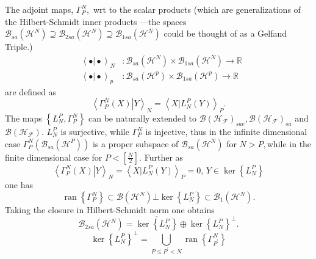 \documentclass[aps,preprint]{revtex4}%
\begin{document}
The adjoint maps, $\Gamma_{P}^{N},$ wrt to the scalar products (which are
generalizations of the Hilbert-Schmidt inner products ---the spaces
$\mathcal{B}_{sa}\left(  \mathcal{H}^{N}\right)  \supseteq\mathcal{B}%
_{2sa}\left(  \mathcal{H}^{N}\right)  \supseteq\mathcal{B}_{1sa}\left(
\mathcal{H}^{N}\right)  $ could be thought of as a Gelfand Triple.)
\begin{align}
\text{ }\left\langle \left.  \bullet\right\vert \bullet\right\rangle _{N}  &
:\mathcal{B}_{sa}\left(  \mathcal{H}^{N}\right)  \times\mathcal{B}%
_{1sa}\left(  \mathcal{H}^{N}\right)  \rightarrow\mathbb{R}\\
\text{ }\left\langle \left.  \bullet\right\vert \bullet\right\rangle _{p}  &
:\mathcal{B}_{sa}\left(  \mathcal{H}^{p}\right)  \times\mathcal{B}%
_{1sa}\left(  \mathcal{H}^{p}\right)  \rightarrow\mathbb{R}%
\end{align}
are defined as
\begin{equation}
\left\langle \left.  \Gamma_{P}^{N}\left(  X\right)  \right\vert
Y\right\rangle _{N}=\left\langle \left.  X\right\vert L_{N}^{P}\left(
Y\right)  \right\rangle _{P}.
\end{equation}
The maps $\left\{  L_{N}^{P},\Gamma_{P}^{N}\right\}  $ can be naturally
extended to $\mathcal{B}\left(  \mathcal{H}_{\mathcal{F}}\right)
_{sae},\mathcal{B}\left(  \mathcal{H}_{\mathcal{F}}\right)  _{sa}$ and
$\mathcal{B}\left(  \mathcal{H}_{\mathcal{F}}\right)  .$ $L_{N}^{P}$ is
surjective, while $\Gamma_{P}^{N}$ is injective, thus in the infinite
dimensional case $\Gamma_{P}^{N}\left(  \mathcal{B}_{sa}\left(  \mathcal{H}%
^{P}\right)  \right)  $ is a proper subspace of $\mathcal{B}_{sa}\left(
\mathcal{H}^{N}\right)  $ for $N>P,$while in the finite dimensional case for
$P<\left[  \frac{N}{2}\right]  .$ Further as
\begin{equation}
\left\langle \left.  \Gamma_{P}^{N}\left(  X\right)  \right\vert
Y\right\rangle _{N}=\left\langle \left.  X\right\vert L_{N}^{P}\left(
Y\right)  \right\rangle _{P}=0,\,Y\in\ker\left\{  L_{N}^{P}\right\}
\end{equation}
one has
\begin{equation}
\operatorname*{ran}\left\{  \Gamma_{P}^{N}\right\}  \subset\mathcal{B}\left(
\mathcal{H}^{N}\right)  \bot\ker\left\{  L_{N}^{P}\right\}  \subset
\mathcal{B}_{1}\left(  \mathcal{H}^{N}\right)  .
\end{equation}
Taking the closure in Hilbert-Schmidt norm one obtains
\begin{equation}
\mathcal{B}_{2sa}\left(  \mathcal{H}^{N}\right)  =\overline{\ker\left\{
L_{N}^{P}\right\}  }\oplus\ker\left\{  L_{N}^{P}\right\}  ^{\bot}.
\end{equation}%
\begin{equation}
\ker\left\{  L_{N}^{P}\right\}  ^{\bot}=%
{\displaystyle\bigcup\limits_{P\leq P^{\prime}<N}}
\operatorname*{ran}\left\{  \Gamma_{P^{\prime}}^{N}\right\}
\end{equation}
\end{document}
